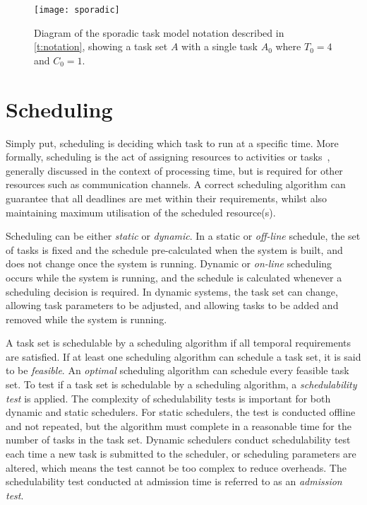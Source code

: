 \begin{figure}[h!tb]
	\begin{center}
		\leavevmode
		\texttt{[image: sporadic]}
        \caption{Diagram of the sporadic task model notation described in \cref{t:notation}, showing
        a task set $A$ with a single task $A_{0}$ where $T_{0} = 4$ and $C_{0} = 1$.}
		\label{fig:fp-schedule}
	\end{center}
\end{figure}


\section{Scheduling}
\label{sec:rt-scheduling}

Simply put, scheduling is deciding which task to run at a specific time. More formally, scheduling
is the act of assigning resources to activities or tasks~\citep{Baruah_CPV_96}, generally discussed
in the context of processing time, but is required for other resources such as communication
channels.  A correct scheduling algorithm  can guarantee that all deadlines are met within their
requirements, whilst also maintaining maximum utilisation of the scheduled resource(s).

Scheduling can be either \emph{static} or \emph{dynamic}. In a static or \emph{off-line} schedule, 
the set of tasks is fixed and the schedule pre-calculated when the system is built, and does not
change once the system is running. 
Dynamic or \emph{on-line} scheduling occurs while the system is running, and the schedule is
calculated whenever a scheduling decision is required. In dynamic systems, the task set can change,
allowing task parameters to be adjusted, and allowing tasks to be added and removed while the system
is running.

A task set is schedulable by a scheduling algorithm if all temporal requirements are satisfied.
If at least one scheduling algorithm can schedule a task set, it is said to be \emph{feasible}.
An \emph{optimal} scheduling algorithm can schedule every feasible task set.
To test if a task set is schedulable by a scheduling algorithm, a \emph{schedulability test} is applied.
The complexity of schedulability tests is important for both dynamic and static schedulers. For
static schedulers, the test is conducted offline and not repeated, but the algorithm must complete
in a reasonable time for the number of tasks in the task set. Dynamic schedulers conduct
schedulability test each time a new task is submitted to the scheduler, or scheduling parameters are
altered, which means the test cannot be too complex to reduce overheads. The schedulability test conducted at admission time is
referred to as an \emph{admission test}.

